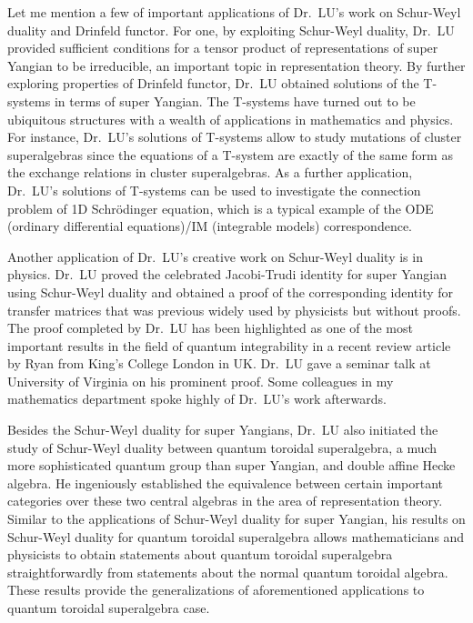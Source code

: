 \documentclass[12pt]{amsart} %
\begin{document}
Let me mention a few of important applications of Dr.\ LU's work on Schur-Weyl duality and Drinfeld functor. For one, by exploiting Schur-Weyl duality, Dr.\ LU provided sufficient conditions for a tensor product of representations of super Yangian to be irreducible, an important topic in representation theory. 
By further exploring properties of Drinfeld functor, Dr.\ LU obtained solutions of the T-systems in terms of super Yangian. The T-systems have turned out to be ubiquitous structures with a wealth of applications in mathematics and physics. For instance, Dr.\ LU's solutions of T-systems allow to study mutations of cluster superalgebras since the equations of a T-system are exactly of the same form as the exchange relations in cluster superalgebras. As a further application, Dr.\ LU's solutions of T-systems can be used to investigate the connection problem of 1D Schr\"{o}dinger equation, which is a typical example of the ODE (ordinary differential equations)/IM (integrable models) correspondence.  

Another application of Dr.\ LU's creative work on Schur-Weyl duality is in physics. Dr.\ LU proved the celebrated Jacobi-Trudi identity for super Yangian using Schur-Weyl duality and obtained a proof of the corresponding identity for transfer matrices that was previous widely used by physicists but without proofs. The proof completed by Dr.\ LU has been highlighted as one of the most important results in the field of quantum integrability in a recent review article by Ryan from King's College London in UK. Dr.\ LU gave a seminar talk at University of Virginia on his prominent proof. Some colleagues in my mathematics department  spoke highly of Dr.\ LU's work afterwards.


Besides the Schur-Weyl duality for super Yangians, Dr.\ LU also initiated the study of Schur-Weyl duality between quantum toroidal superalgebra, a much more sophisticated quantum group than super Yangian, and double affine Hecke algebra. He ingeniously established the equivalence between certain important categories over these two central algebras in the area of representation theory. Similar to the applications of Schur-Weyl duality for super Yangian, his results on Schur-Weyl duality for quantum toroidal superalgebra allows mathematicians and physicists to obtain statements about quantum toroidal superalgebra straightforwardly from statements about the normal quantum toroidal algebra. These results provide the generalizations of aforementioned applications to quantum toroidal superalgebra case.
\end{document}
